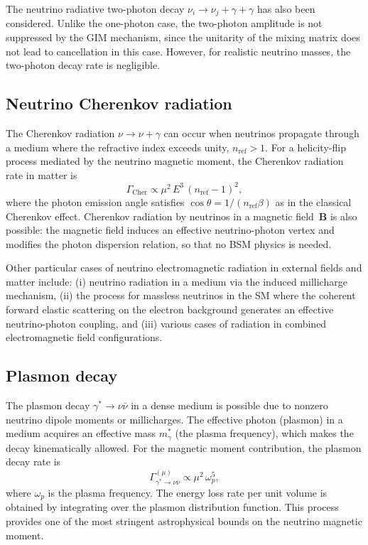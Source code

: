 \documentclass[a4paper,11pt]{article}
\begin{document}
The neutrino radiative two-photon decay $\nu_i \to \nu_j + \gamma + \gamma$ has also been considered. Unlike the one-photon case, the two-photon amplitude is not suppressed by the GIM mechanism, since the unitarity of the mixing matrix does not lead to cancellation in this case. However, for realistic neutrino masses, the two-photon decay rate is negligible.

\subsection{Neutrino Cherenkov radiation}

The Cherenkov radiation $\nu \to \nu + \gamma$ can occur when neutrinos propagate through a medium where the refractive index exceeds unity, $n_{\text{ref}} > 1$. For a helicity-flip process mediated by the neutrino magnetic moment, the Cherenkov radiation rate in matter is
\begin{equation}
\Gamma_{\text{Cher}} \propto \mu^2\,E^3\,(n_{\text{ref}} - 1)^2,
\end{equation}
where the photon emission angle satisfies $\cos\theta = 1/(n_{\text{ref}}\beta)$ as in the classical Cherenkov effect. Cherenkov radiation by neutrinos in a magnetic field~$\mathbf{B}$ is also possible: the magnetic field induces an effective neutrino-photon vertex and modifies the photon dispersion relation, so that no BSM physics is needed.

Other particular cases of neutrino electromagnetic radiation in external fields and matter include: (i) neutrino radiation in a medium via the induced millicharge mechanism, (ii) the process for massless neutrinos in the SM where the coherent forward elastic scattering on the electron background generates an effective neutrino-photon coupling, and (iii) various cases of radiation in combined electromagnetic field configurations.

\subsection{Plasmon decay}

The plasmon decay $\gamma^* \to \nu\bar{\nu}$ in a dense medium is possible due to nonzero neutrino dipole moments or millicharges. The effective photon (plasmon) in a medium acquires an effective mass $m_\gamma^*$ (the plasma frequency), which makes the decay kinematically allowed. For the magnetic moment contribution, the plasmon decay rate is~\cite{Raffelt:1990}
\begin{equation}
\Gamma_{\gamma^* \to \nu\bar{\nu}}^{(\mu)} \propto \mu^2\,\omega_p^5,
\end{equation}
where $\omega_p$ is the plasma frequency. The energy loss rate per unit volume is obtained by integrating over the plasmon distribution function. This process provides one of the most stringent astrophysical bounds on the neutrino magnetic moment.
\end{document}
